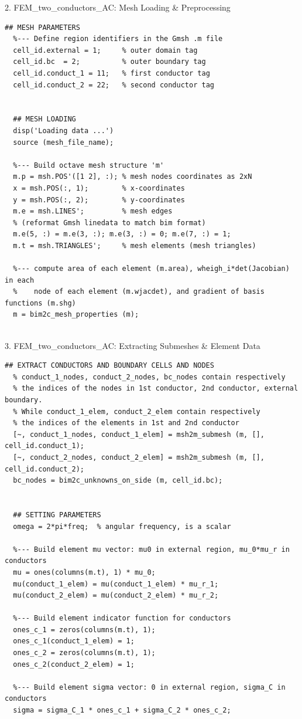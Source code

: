 \documentclass[aspectratio=54,xcolor=dvipsnames]{beamer}
\begin{document}
\begin{frame}[fragile]{2. FEM\_two\_conductors\_AC: Mesh Loading \& Preprocessing}
\scriptsize
\begin{lstlisting}[firstnumber=22]
  ## MESH PARAMETERS
  %--- Define region identifiers in the Gmsh .m file
  cell_id.external = 1;     % outer domain tag
  cell_id.bc  = 2;          % outer boundary tag
  cell_id.conduct_1 = 11;   % first conductor tag
  cell_id.conduct_2 = 22;   % second conductor tag


  ## MESH LOADING
  disp('Loading data ...')
  source (mesh_file_name);

  %--- Build octave mesh structure 'm'
  m.p = msh.POS'([1 2], :); % mesh nodes coordinates as 2xN
  x = msh.POS(:, 1);        % x-coordinates
  y = msh.POS(:, 2);        % y-coordinates
  m.e = msh.LINES';         % mesh edges
  % (reformat Gmsh linedata to match bim format)
  m.e(5, :) = m.e(3, :); m.e(3, :) = 0; m.e(7, :) = 1;
  m.t = msh.TRIANGLES';     % mesh elements (mesh triangles)

  %--- compute area of each element (m.area), wheigh_i*det(Jacobian) in each 
  %    node of each element (m.wjacdet), and gradient of basis functions (m.shg)
  m = bim2c_mesh_properties (m);
  
\end{lstlisting}
\end{frame}

\begin{frame}[fragile]{3. FEM\_two\_conductors\_AC: Extracting Submeshes \& Element Data}
\scriptsize
\begin{lstlisting}[firstnumber=48]
  ## EXTRACT CONDUCTORS AND BOUNDARY CELLS AND NODES
  % conduct_1_nodes, conduct_2_nodes, bc_nodes contain respectively
  % the indices of the nodes in 1st conductor, 2nd conductor, external boundary.
  % While conduct_1_elem, conduct_2_elem contain respectively
  % the indices of the elements in 1st and 2nd conductor
  [~, conduct_1_nodes, conduct_1_elem] = msh2m_submesh (m, [], cell_id.conduct_1);
  [~, conduct_2_nodes, conduct_2_elem] = msh2m_submesh (m, [], cell_id.conduct_2);
  bc_nodes = bim2c_unknowns_on_side (m, cell_id.bc);


  ## SETTING PARAMETERS
  omega = 2*pi*freq;  % angular frequency, is a scalar

  %--- Build element mu vector: mu0 in external region, mu_0*mu_r in conductors
  mu = ones(columns(m.t), 1) * mu_0;
  mu(conduct_1_elem) = mu(conduct_1_elem) * mu_r_1;
  mu(conduct_2_elem) = mu(conduct_2_elem) * mu_r_2;

  %--- Build element indicator function for conductors
  ones_c_1 = zeros(columns(m.t), 1);
  ones_c_1(conduct_1_elem) = 1;
  ones_c_2 = zeros(columns(m.t), 1);
  ones_c_2(conduct_2_elem) = 1;

  %--- Build element sigma vector: 0 in external region, sigma_C in conductors
  sigma = sigma_C_1 * ones_c_1 + sigma_C_2 * ones_c_2;
  
\end{lstlisting}
\end{frame}
\end{document}
